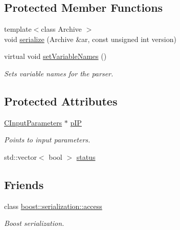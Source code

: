 \subsection*{Protected Member Functions}
\begin{DoxyCompactItemize}
\item 
{\footnotesize template$<$class Archive $>$ }\\void \hyperlink{class_go_s_u_m_1_1_c_model_constraints_a7e4ec6b59419b56907b7cfedec230ca7}{serialize} (Archive \&ar, const unsigned int version)
\item 
virtual void \hyperlink{class_go_s_u_m_1_1_c_model_constraints_afe8e8cbf1fc08ae1f2ee494146da01fa}{set\-Variable\-Names} ()
\begin{DoxyCompactList}\small\item\em Sets variable names for the parser. \end{DoxyCompactList}\end{DoxyCompactItemize}
\subsection*{Protected Attributes}
\begin{DoxyCompactItemize}
\item 
\hyperlink{class_go_s_u_m_1_1_c_input_parameters}{C\-Input\-Parameters} $\ast$ \hyperlink{class_go_s_u_m_1_1_c_model_constraints_a174e787472c4043054393c0bb5aaf402}{p\-I\-P}
\begin{DoxyCompactList}\small\item\em Points to input parameters. \end{DoxyCompactList}\item 
std\-::vector$<$ bool $>$ \hyperlink{class_go_s_u_m_1_1_c_model_constraints_a499e59d8384b98eaba5498043e792f26}{status}
\end{DoxyCompactItemize}
\subsection*{Friends}
\begin{DoxyCompactItemize}
\item 
class \hyperlink{class_go_s_u_m_1_1_c_model_constraints_ac98d07dd8f7b70e16ccb9a01abf56b9c}{boost\-::serialization\-::access}
\begin{DoxyCompactList}\small\item\em Boost serialization. \end{DoxyCompactList}\end{DoxyCompactItemize}


